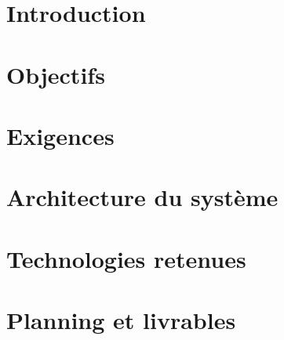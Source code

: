 \documentclass[
    iict, %
    tr,   %
]{heig-tb}
\begin{document}
\maketitle
\frontmatter
\clearemptydoublepage

\begin{abstract}
    
\end{abstract}

\clearemptydoublepage
{
    \tableofcontents
    \let\cleardoublepage\clearpage
    \listoffigures
    \let\cleardoublepage\clearpage
    \listoftables
}

\clearemptydoublepage
{}

\mainmatter

\chapter{Introduction}


\chapter{Objectifs}


\chapter{Exigences}


\chapter{Architecture du système}


\chapter{Technologies retenues}


\chapter{Planning et livrables}


\clearpage
\printbibliography

\let\cleardoublepage\clearpage
\backmatter

\label{glossaire}
\printnoidxglossary
\label{index}
\printindex
\end{document}
